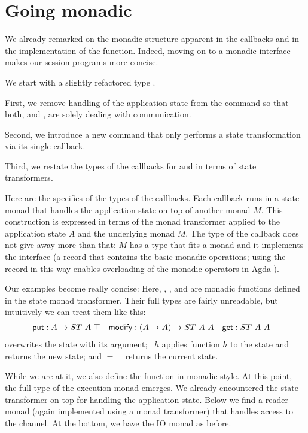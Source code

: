 \documentclass[acmsmall,screen,anonymous,review]{acmart}
\begin{document}
\section{Going monadic}
\label{sec:going-monadic}


We already remarked on the monadic structure apparent in the
callbacks and in the implementation of the {\Aexecutor}
function. Indeed, moving on to a monadic interface makes our session
programs more concise.

We start with a slightly refactored type {\ACommand}.
\mstCommand

First, we remove handling of the application state from the
{\ACCHOICE} command so that both, {\ACSELECT} and {\ACCHOICE}, are solely
dealing with communication.

Second, we introduce a new {\ACSKIP} command that only performs a state
transformation via its single callback.

Third, we restate the types of the callbacks for {\ACSEND} and {\ACRECV} in terms of state transformers.

Here are the specifics of the types of the callbacks. Each callback
runs in a state monad that handles the application state on top of
another monad $M$. This construction is expressed in terms of the
monad transformer {\AStateT} applied to the application state
$A$ and the underlying monad $M$. The type of the callback does not give away more
than that: $M$ has a type that fits a monad and it implements the
interface {\ARawMonad} (a record that contains the basic monadic
operations; using the record in this way enables overloading of the
monadic operators in Agda \cite{DBLP:conf/icfp/DevrieseP11}). 

Our examples become really concise:
\mstExampleServers
Here, {\Aput}, {\Amodify}, and {\Aget} are monadic functions defined
in the state monad transformer. Their full types are fairly
unreadable, but intuitively we can treat them like this:
\begin{align*}
  \Aput &: A \to ST~A~\top
  & \Amodify &: (A \to A)\to ST~A~A
  & \Aget &: ST~A~A
\end{align*}
{\Aput} overwrites the state with its argument; {\Amodify~$h$} applies 
function $h$ to the state and returns the new state; and {\Aget $=$ \Amodify~\Aid} returns the current state.

While we are at it, we also define the {\Aexecutor} function in
monadic style. At this point, the full type of the execution monad
emerges. We already encountered the state transformer on top for
handling the application state. Below we find a reader monad (again
implemented using a monad transformer) that handles access to the
channel. At the bottom, we have the IO monad as before.
\mstExecutor
\end{document}

